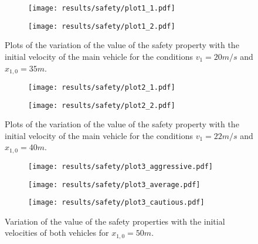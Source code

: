 \begin{figure}[H]
\centering
\begin{subfigure}{0.49\textwidth}
  \centering
  \texttt{[image: results/safety/plot1\_1.pdf]}
\end{subfigure}
\begin{subfigure}{0.49\textwidth}
  \centering
  \texttt{[image: results/safety/plot1\_2.pdf]}
\end{subfigure} 
\caption{Plots of the variation of the value of the safety property with the initial velocity of the main vehicle for the conditions $v_1 = 20m/s$ and $x_{1,0} = 35m$.}
\label{fig:plot1}
\end{figure}

\begin{figure}[H]
\centering
\begin{subfigure}{0.49\textwidth}
  \centering
  \texttt{[image: results/safety/plot2\_1.pdf]}
\end{subfigure}
\begin{subfigure}{0.49\textwidth}
  \centering
  \texttt{[image: results/safety/plot2\_2.pdf]}
\end{subfigure} 
\caption{Plots of the variation of the value of the safety property with the initial velocity of the main vehicle for the conditions $v_1 = 22m/s$ and $x_{1,0} = 40m$.}
\label{fig:plot2}
\end{figure}

\begin{figure}[H]
\centering
\begin{subfigure}{0.55\textwidth}
  \centering
  \texttt{[image: results/safety/plot3\_aggressive.pdf]}
\end{subfigure}
\begin{subfigure}{0.55\textwidth}
  \centering
  \texttt{[image: results/safety/plot3\_average.pdf]}
\end{subfigure} 
\begin{subfigure}{0.55\textwidth}
  \centering
  \texttt{[image: results/safety/plot3\_cautious.pdf]}
\end{subfigure} 
\caption{Variation of the value of the safety properties with the initial velocities of both vehicles for $x_{1,0} = 50m$.}
\label{fig:plot3}
\end{figure}

